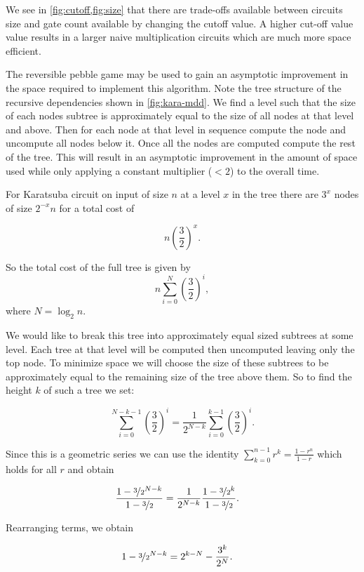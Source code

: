 We see in \cref{fig:cutoff,fig:size} that there are trade-offs available
between circuits size and gate count available by changing the cutoff
value. A higher cut-off value value results in a larger naive
multiplication circuits which are much more space efficient.

The reversible pebble game may be used to gain an asymptotic improvement
in the space required to implement this algorithm. Note the tree structure of
the recursive dependencies shown in \cref{fig:kara-mdd}.  We find a level such
that the size of each nodes subtree is approximately equal to the size of all
nodes at that level and above. Then for each node at that level in sequence
compute the node and uncompute all nodes below it. Once all the nodes are
computed compute the rest of the tree.  This will result in an asymptotic
improvement in the amount of space used while only applying a constant
multiplier ($<2$) to the overall time.


For Karatsuba circuit on input of size $n$ at a level $x$ in the tree there are
$3^x$ nodes of size $2^{-x}n$ for a total cost of

\[
n\left(\frac{3}{2}\right)^x.
\]

So the total cost of the full tree is given by
\[
    n\sum_{i=0}^{N} \left(\frac{3}{2}\right)^i,
\]
where $N=\log_2 n$.

We would like to break this tree into approximately equal sized subtrees at
some level.  Each tree at that level will be computed then uncomputed leaving
only the top node. To minimize space we will choose the size of these subtrees
to be approximately equal to the remaining size of the tree above them.  So to
find the height $k$ of such a tree we set:

\[
    \sum_{i=0}^{N-k-1} \left(\frac{3}{2}\right)^i = \frac{1}{2^{N-k}}\sum_{i=0}^{k-1} \left(\frac{3}{2}\right)^i.
\]

Since this is a geometric series we can use the identity $\sum_{k=0}^{n-1} r^k
= \frac{1-r^n}{1-r}$ which holds for all $r$ and obtain

\begin{align*}
    \frac{1- \nicefrac{3}{2}^{N-k}}{1 - \nicefrac{3}{2}} &= \frac{1}{2^{N-k}}\frac{1- \nicefrac{3}{2}^{k}}{1 - \nicefrac{3}{2}}.
\end{align*}

Rearranging terms, we obtain

\begin{align*}
    1- \nicefrac{3}{2}^{N-k} &= 2^{k-N} - \frac{3^k}{2^N}.
\end{align*}

